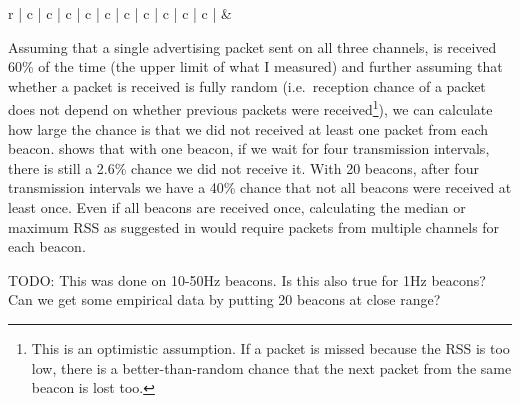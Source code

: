 \newcommand{\packetlosscell}[1]{& \footnotesize{#1}}
\begin{table}
    \begin{tabular}{r | c | c | c | c | c | c | c | c | c | c |}
        &  \\
    \end{tabular}
    \caption{Chance that not all beacons have been received at least once}
    \label{tbl:rss-packet-loss}
\end{table}

Assuming that a single advertising packet sent on all three channels, is received 60\% of the time (the upper limit of what I measured) and further assuming that whether a packet is received is fully random (i.e.\ reception chance of a packet does not depend on whether previous packets were received\footnote{This is an optimistic assumption. If a packet is missed because the RSS is too low, there is a better-than-random chance that the next packet from the same beacon is lost too.}), we can calculate how large the chance is that we did not received at least one packet from each beacon.
 shows that with one beacon, if we wait for four transmission intervals, there is still a 2.6\% chance we did not receive it.
With 20 beacons, after four transmission intervals we have a 40\% chance that not all beacons were received at least once.
Even if all beacons are received once, calculating the median or maximum RSS as suggested in  would require packets from multiple channels for each beacon.

TODO: This was done on 10-50Hz beacons. Is this also true for 1Hz beacons? Can we get some empirical data by putting 20 beacons at close range?
